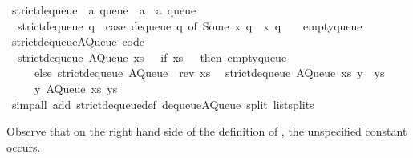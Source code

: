 \begin{isabellebody}
\isamarkupfalse%
\ strict{\isacharunderscore}dequeue{\isacharprime}\ {\isacharcolon}{\isacharcolon}\ {\isachardoublequoteopen}{\isacharprime}a\ queue\ {\isasymRightarrow}\ {\isacharprime}a\ {\isasymtimes}\ {\isacharprime}a\ queue{\isachardoublequoteclose}\ \isanewline
\ \ {\isachardoublequoteopen}strict{\isacharunderscore}dequeue{\isacharprime}\ q\ {\isacharequal}\ {\isacharparenleft}case\ dequeue\ q\ of\ {\isacharparenleft}Some\ x{\isacharcomma}\ q{\isacharprime}{\isacharparenright}\ {\isasymRightarrow}\ {\isacharparenleft}x{\isacharcomma}\ q{\isacharprime}{\isacharparenright}\ {\isacharbar}\ {\isacharunderscore}\ {\isasymRightarrow}\ empty{\isacharunderscore}queue{\isacharparenright}{\isachardoublequoteclose}\isanewline
\isanewline
{}\isamarkupfalse%
\ strict{\isacharunderscore}dequeue{\isacharprime}{\isacharunderscore}AQueue\ {\isacharbrackleft}code{\isacharbrackright}{\isacharcolon}\isanewline
\ \ {\isachardoublequoteopen}strict{\isacharunderscore}dequeue{\isacharprime}\ {\isacharparenleft}AQueue\ xs\ {\isacharbrackleft}{\isacharbrackright}{\isacharparenright}\ {\isacharequal}\ {\isacharparenleft}if\ xs\ {\isacharequal}\ {\isacharbrackleft}{\isacharbrackright}\ then\ empty{\isacharunderscore}queue\isanewline
\ \ \ \ \ else\ strict{\isacharunderscore}dequeue{\isacharprime}\ {\isacharparenleft}AQueue\ {\isacharbrackleft}{\isacharbrackright}\ {\isacharparenleft}rev\ xs{\isacharparenright}{\isacharparenright}{\isacharparenright}{\isachardoublequoteclose}\isanewline
\ \ {\isachardoublequoteopen}strict{\isacharunderscore}dequeue{\isacharprime}\ {\isacharparenleft}AQueue\ xs\ {\isacharparenleft}y\ {\isacharhash}\ ys{\isacharparenright}{\isacharparenright}\ {\isacharequal}\isanewline
\ \ \ \ \ {\isacharparenleft}y{\isacharcomma}\ AQueue\ xs\ ys{\isacharparenright}{\isachardoublequoteclose}\isanewline
\ \ \isamarkupfalse%
\ {\isacharparenleft}simp{\isacharunderscore}all\ add{\isacharcolon}\ strict{\isacharunderscore}dequeue{\isacharprime}{\isacharunderscore}def\ dequeue{\isacharunderscore}AQueue\ split{\isacharcolon}\ list{\isachardot}splits{\isacharparenright}%
\endisatagquote
{\isafoldquote}%
%
\isadelimquote
%
\endisadelimquote
%
\begin{isamarkuptext}%
Observe that on the right hand side of the definition of , the unspecified constant  occurs.


\end{isamarkuptext}
\end{isabellebody}
